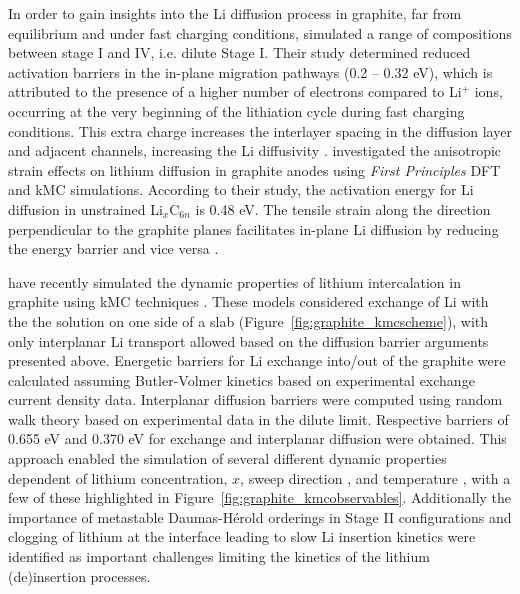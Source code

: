 \documentclass[../main.tex]{subfiles}
\begin{document}
In order to gain insights into the Li diffusion process in graphite, far from equilibrium and under fast charging conditions, \citeauthor{Hakim} simulated a range of compositions between stage I and IV, i.e. dilute Stage I. \cite{Hakim} Their study determined reduced activation barriers in the in-plane migration pathways (0.2 -- 0.32 eV), which is attributed to the presence of a higher number of electrons compared to Li$^{+}$ ions, occurring at the very beginning of the lithiation cycle during fast charging conditions. This extra charge increases the interlayer spacing in the diffusion layer and adjacent channels, increasing the Li diffusivity \cite{Hakim}. \citeauthor{JI201866} investigated the anisotropic strain effects on lithium diffusion in graphite anodes using \textit{First Principles} DFT and kMC simulations. \cite{JI201866} According to their study, the activation energy for Li diffusion in unstrained Li$_{x}$C$_{6n}$ is 0.48 eV. The tensile strain along the direction perpendicular to the graphite planes facilitates in-plane Li diffusion by reducing the energy barrier and vice versa \cite{JI201866}. 

\citeauthor{gavilan-arriazu_kinetic_2020} have recently simulated the dynamic properties of lithium intercalation in graphite using kMC techniques \cite{gavilan-arriazu_kinetic_2020,gavilan-arriazu_effect_2020,GAVILANARRIAZU2018133}. These models considered exchange of Li with the the solution on one side of a slab (Figure~\ref{fig:graphite_kmcscheme}), with only interplanar Li transport allowed based on the diffusion barrier arguments presented above. Energetic barriers for Li exchange into/out of the graphite were calculated assuming Butler-Volmer kinetics based on experimental exchange current density data. Interplanar diffusion barriers were computed using random walk theory based on experimental data in the dilute limit. Respective barriers of 0.655 eV and 0.370 eV for exchange and interplanar diffusion were obtained. This approach enabled the simulation of several different dynamic properties dependent of lithium concentration, $x$, \cite{gavilan-arriazu_kinetic_2020,gavilan-arriazu_kinetic_2020} sweep direction \cite{gavilan-arriazu_kinetic_2020}, and temperature \cite{gavilan-arriazu_effect_2020}, with a few of these highlighted in Figure~\ref{fig:graphite_kmcobservables}. Additionally the importance of metastable Daumas-H\'{e}rold orderings in Stage II configurations \cite{GAVILANARRIAZU2018133} and clogging of lithium at the interface \cite{gavilan-arriazu_kinetic_2020} leading to slow Li insertion kinetics were identified as important challenges limiting the kinetics of the lithium (de)insertion processes.  
\end{document}
